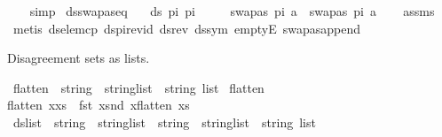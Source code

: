 \begin{isabellebody}
\ \ \isamarkupfalse%
\ simp%
\endisatagproof
{\isafoldproof}%
%
\isadelimproof
\isanewline
%
\endisadelimproof
\isanewline
{}\isamarkupfalse%
\ ds{\isacharunderscore}{\kern0pt}swapas{\isacharunderscore}{\kern0pt}eq{\isacharcolon}{\kern0pt}\isanewline
\ \ \ {\isachardoublequoteopen}ds\ pi{}\ pi{}\ {\isacharequal}{\kern0pt}\ {\isacharbraceleft}{\kern0pt}{\isacharbraceright}{\kern0pt}{\isachardoublequoteclose}\isanewline
\ \ \ {\isachardoublequoteopen}swapas\ pi{}\ a\ {\isacharequal}{\kern0pt}\ swapas\ pi{}\ a{\isachardoublequoteclose}\isanewline
%
\isadelimproof
\ \ %
\endisadelimproof
%
\isatagproof
{}\isamarkupfalse%
\ assms\isanewline
\ \ \isamarkupfalse%
\ {\isacharparenleft}{\kern0pt}metis\ ds{\isacharunderscore}{\kern0pt}elem{\isacharunderscore}{\kern0pt}cp\ ds{\isacharunderscore}{\kern0pt}pi{\isacharunderscore}{\kern0pt}rev{\isacharunderscore}{\kern0pt}id\ ds{\isacharunderscore}{\kern0pt}rev\ ds{\isacharunderscore}{\kern0pt}sym\ emptyE\ swapas{\isacharunderscore}{\kern0pt}append{\isacharparenright}{\kern0pt}%
\endisatagproof
{\isafoldproof}%
%
\isadelimproof
%
\endisadelimproof
%
\begin{isamarkuptext}%
Disagreement sets as lists.%
\end{isamarkuptext}\isamarkuptrue%
\isamarkupfalse%
\ flatten\ {\isacharcolon}{\kern0pt}{\isacharcolon}{\kern0pt}\ {\isachardoublequoteopen}{\isacharparenleft}{\kern0pt}string\ {\isasymtimes}\ string{\isacharparenright}{\kern0pt}list\ {\isasymRightarrow}\ string\ list{\isachardoublequoteclose}\ \isanewline
{\isachardoublequoteopen}flatten\ {\isacharbrackleft}{\kern0pt}{\isacharbrackright}{\kern0pt}\ \ \ \ \ {\isacharequal}{\kern0pt}\ {\isacharbrackleft}{\kern0pt}{\isacharbrackright}{\kern0pt}{\isachardoublequoteclose}\ {\isacharbar}{\kern0pt}\isanewline
{\isachardoublequoteopen}flatten\ {\isacharparenleft}{\kern0pt}x{\isacharhash}{\kern0pt}xs{\isacharparenright}{\kern0pt}\ {\isacharequal}{\kern0pt}\ {\isacharparenleft}{\kern0pt}fst\ x{\isacharparenright}{\kern0pt}{\isacharhash}{\kern0pt}{\isacharparenleft}{\kern0pt}snd\ x{\isacharparenright}{\kern0pt}{\isacharhash}{\kern0pt}{\isacharparenleft}{\kern0pt}flatten\ xs{\isacharparenright}{\kern0pt}{\isachardoublequoteclose}\isanewline
\isanewline
{}\isamarkupfalse%
\ ds{\isacharunderscore}{\kern0pt}list\ {\isacharcolon}{\kern0pt}{\isacharcolon}{\kern0pt}\ {\isachardoublequoteopen}{\isacharparenleft}{\kern0pt}string\ {\isasymtimes}\ string{\isacharparenright}{\kern0pt}list\ {\isasymRightarrow}\ {\isacharparenleft}{\kern0pt}string\ {\isasymtimes}\ string{\isacharparenright}{\kern0pt}list\ {\isasymRightarrow}\ string\ list{\isachardoublequoteclose}\ \isanewline

\end{isabellebody}
